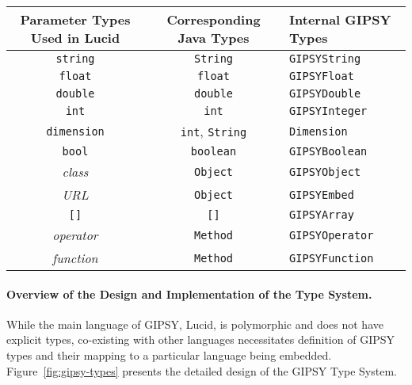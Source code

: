 \documentclass{easychair}
\newcommand{\xf}[1]{Figure~\ref{#1}}
\newcommand{\gipsy}{{GIPSY\index{GIPSY}}}
\newcommand{\lucid}{{Lucid\index{Lucid}}}
\newcommand{\api}[1]{\texttt{#1}\index{API!#1}}
\begin{document}
\begin{table*}[htb!]
\begin{minipage}[b]{\textwidth}
\begin{center}
\begin{tabular}{|c|c|l|}
{\scriptsize Parameter Types Used in Lucid} & {\scriptsize Corresponding Java Types}   & {\scriptsize Internal GIPSY Types} \\ \hline\hline
\api{string}                                & \api{String}                             & \api{GIPSYString}\\
\api{float}                                 & \api{float}                              & \api{GIPSYFloat}\\
\api{double}                                & \api{double}                             & \api{GIPSYDouble}\\
\api{int}                                   & \api{int}                                & \api{GIPSYInteger} \\
\api{dimension}                             & \api{int}, \api{String}                  & \api{Dimension} \\
\api{bool}                                  & \api{boolean}                            & \api{GIPSYBoolean}\\
{\it class}                                 & \api{Object}                             & \api{GIPSYObject}\\
{\it URL}                                   & \api{Object}                             & \api{GIPSYEmbed}\\
\api{[]}                                    & \api{[]}                                 & \api{GIPSYArray}\\
{\it operator}                              & \api{Method}                             & \api{GIPSYOperator}\\
{\it function}                              & \api{Method}                             & \api{GIPSYFunction}\\ \hline
\end{tabular}
\end{center}
\end{minipage}
\label{tab:datatypes}
\end{table*}


\paragraph{Overview of the Design and Implementation of the Type System.}

While the main language of {\gipsy}, {\lucid}, is polymorphic and does not have explicit types, co-existing with other languages necessitates definition of GIPSY types and their mapping to a particular language being embedded. \xf{fig:gipsy-types} presents the detailed design of the GIPSY Type System.
\end{document}
